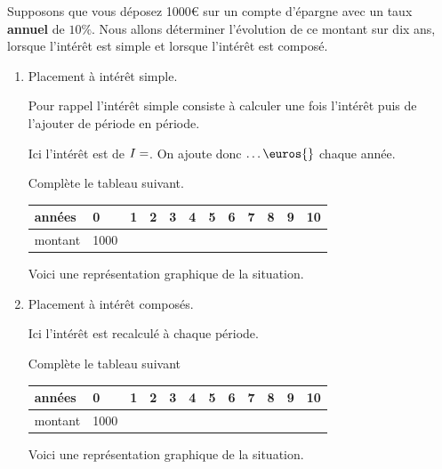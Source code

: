 \documentclass[a4paper,12pt]{report}
\begin{document}
Supposons que vous déposez 1000€ sur un compte d'épargne avec un taux \textbf{annuel}
de \(10\%\). Nous allons déterminer l'évolution de ce montant sur dix ans, lorsque
l'intérêt est simple et lorsque l'intérêt est composé.

\begin{enumerate}
\item Placement à intérêt simple.
\label{sec:org62f1814}

Pour rappel l'intérêt simple consiste à calculer une fois l'intérêt puis de
l'ajouter de période en période.

Ici l'intérêt est de \(I=\dotfill\). On ajoute donc \(\ldots\euros{}\) chaque année.

Complète le tableau suivant.

\begin{center}
\begin{tabular}{|l|p{1cm}|p{1cm}|p{1cm}|p{1cm}|p{1cm}|p{1cm}|p{1cm}|p{1cm}|p{1cm}|p{1cm}|p{1cm}|}
\hline
années & 0 & 1 & 2 & 3 & 4 & 5 & 6 & 7 & 8 & 9 & 10\\[0pt]
\hline
montant & 1000 &  &  &  &  &  &  &  &  &  & \\[0pt]
\hline
\end{tabular}
\end{center}

Voici une représentation graphique de la situation.

\begin{center}

\end{center}

\item Placement à intérêt composés.
\label{sec:orgd9a8609}

Ici l'intérêt est recalculé à chaque période.

Complète le tableau suivant

\begin{center}
\begin{tabular}{|l|p{1cm}|p{1cm}|p{1cm}|p{1cm}|p{1cm}|p{1cm}|p{1cm}|p{1cm}|p{1cm}|p{1cm}|p{1cm}|}
\hline
années & 0 & 1 & 2 & 3 & 4 & 5 & 6 & 7 & 8 & 9 & 10\\[0pt]
\hline
montant & 1000 &  &  &  &  &  &  &  &  &  & \\[0pt]
\hline
\end{tabular}
\end{center}


Voici une représentation graphique de la situation.

\begin{center}

\end{center}


\end{enumerate}
\end{document}
